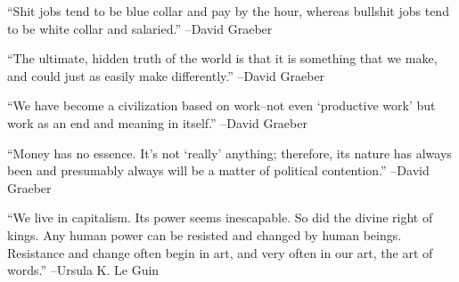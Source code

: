 \documentclass{article}%
\begin{document}
\linebreak%
\vspace{1mm}%
\begin{minipage}{\textwidth}%
\flushleft%
“Shit jobs tend to be blue collar and pay by the hour, whereas bullshit jobs tend to be white collar and salaried.”%
\linebreak%
\vspace{1mm}%
–David Graeber%
\linebreak%
\vspace{1mm}%
\end{minipage}%
\linebreak%
\vspace{1mm}%
\begin{minipage}{\textwidth}%
\flushleft%
“The ultimate, hidden truth of the world is that it is something that we make, and could just as easily make differently.”%
\linebreak%
\vspace{1mm}%
–David Graeber%
\linebreak%
\vspace{1mm}%
\end{minipage}%
\linebreak%
\vspace{1mm}%
\begin{minipage}{\textwidth}%
\flushleft%
“We have become a civilization based on work–not even ‘productive work’ but work as an end and meaning in itself.”%
\linebreak%
\vspace{1mm}%
–David Graeber%
\linebreak%
\vspace{1mm}%
\end{minipage}%
\linebreak%
\vspace{1mm}%
\begin{minipage}{\textwidth}%
\flushleft%
“Money has no essence. It's not ‘really’ anything; therefore, its nature has always been and presumably always will be a matter of political contention.”%
\linebreak%
\vspace{1mm}%
–David Graeber%
\linebreak%
\vspace{1mm}%
\end{minipage}%
\linebreak%
\vspace{1mm}%
\begin{minipage}{\textwidth}%
\flushleft%
“We live in capitalism. Its power seems inescapable. So did the divine right of kings. Any human power can be resisted and changed by human beings. Resistance and change often begin in art, and very often in our art, the art of words.”%
\linebreak%
\vspace{1mm}%
–Ursula K. Le Guin%
\linebreak%
\vspace{1mm}%
\end{minipage}%
\end{document}
